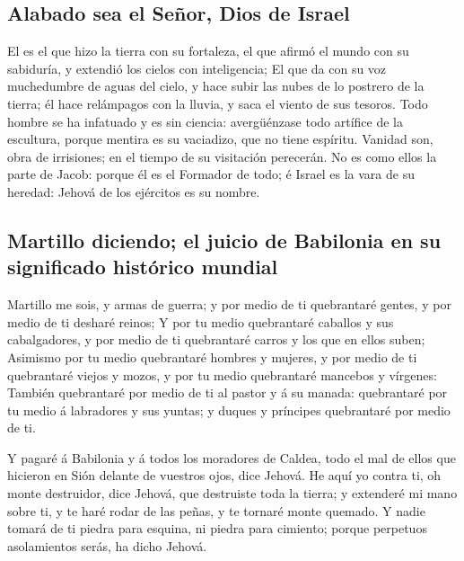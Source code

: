 \hypertarget{alabado-sea-el-seuxf1or-dios-de-israel}{%
\subsection{Alabado sea el Señor, Dios de
Israel}\label{alabado-sea-el-seuxf1or-dios-de-israel}}

 El es el que hizo la tierra con su fortaleza, el que
afirmó el mundo con su sabiduría, y extendió los cielos con
inteligencia;  El que da con su voz muchedumbre de aguas
del cielo, y hace subir las nubes de lo postrero de la tierra; él hace
relámpagos con la lluvia, y saca el viento de sus tesoros. 
Todo hombre se ha infatuado y es sin ciencia: avergüénzase todo artífice
de la escultura, porque mentira es su vaciadizo, que no tiene espíritu.
 Vanidad son, obra de irrisiones; en el tiempo de su
visitación perecerán.  No es como ellos la parte de Jacob:
porque él es el Formador de todo; é Israel es la vara de su heredad:
Jehová de los ejércitos es su nombre.

\hypertarget{martillo-diciendo-el-juicio-de-babilonia-en-su-significado-histuxf3rico-mundial}{%
\subsection{Martillo diciendo; el juicio de Babilonia en su significado
histórico
mundial}\label{martillo-diciendo-el-juicio-de-babilonia-en-su-significado-histuxf3rico-mundial}}

 Martillo me sois, y armas de guerra; y por medio de ti
quebrantaré gentes, y por medio de ti desharé reinos;  Y
por tu medio quebrantaré caballos y sus cabalgadores, y por medio de ti
quebrantaré carros y los que en ellos suben;  Asimismo por
tu medio quebrantaré hombres y mujeres, y por medio de ti quebrantaré
viejos y mozos, y por tu medio quebrantaré mancebos y vírgenes:
 También quebrantaré por medio de ti al pastor y á su
manada: quebrantaré por tu medio á labradores y sus yuntas; y duques y
príncipes quebrantaré por medio de ti.

 Y pagaré á Babilonia y á todos los moradores de Caldea,
todo el mal de ellos que hicieron en Sión delante de vuestros ojos, dice
Jehová.  He aquí yo contra ti, oh monte destruidor, dice
Jehová, que destruiste toda la tierra; y extenderé mi mano sobre ti, y
te haré rodar de las peñas, y te tornaré monte quemado.  Y
nadie tomará de ti piedra para esquina, ni piedra para cimiento; porque
perpetuos asolamientos serás, ha dicho Jehová.

